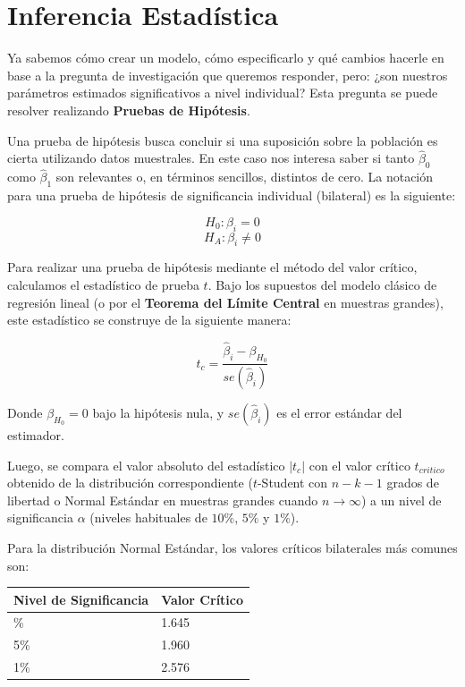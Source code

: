 \documentclass[
]{book}
\begin{document}
\section{Inferencia Estadística}\label{inferencia-estaduxedstica}

Ya sabemos cómo crear un modelo, cómo especificarlo y qué cambios hacerle en base a la pregunta de investigación que queremos responder, pero: ¿son nuestros parámetros estimados significativos a nivel individual? Esta pregunta se puede resolver realizando \textbf{Pruebas de Hipótesis}.

Una prueba de hipótesis busca concluir si una suposición sobre la población es cierta utilizando datos muestrales. En este caso nos interesa saber si tanto \(\hat{\beta}_0\) como \(\hat{\beta}_1\) son relevantes o, en términos sencillos, distintos de cero. La notación para una prueba de hipótesis de significancia individual (bilateral) es la siguiente:

\[H_0: \beta_i = 0\]
\[H_A: \beta_i \neq 0\]

Para realizar una prueba de hipótesis mediante el método del valor crítico, calculamos el estadístico de prueba \(t\). Bajo los supuestos del modelo clásico de regresión lineal (o por el \textbf{Teorema del Límite Central} en muestras grandes), este estadístico se construye de la siguiente manera:

\[t_c = \frac{\hat{\beta}_i - \beta_{H_0}}{se(\hat{\beta}_i)}\]

Donde \(\beta_{H_0} = 0\) bajo la hipótesis nula, y \(se(\hat{\beta}_i)\) es el error estándar del estimador.

Luego, se compara el valor absoluto del estadístico \(|t_c|\) con el valor crítico \(t_{critico}\) obtenido de la distribución correspondiente (\(t\)-Student con \(n-k-1\) grados de libertad o Normal Estándar en muestras grandes cuando \(n\rightarrow \infty\)) a un nivel de significancia \(\alpha\) (niveles habituales de \(10\%\), \(5\%\) y \(1\%\)).

Para la distribución Normal Estándar, los valores críticos bilaterales más comunes son:

\begin{longtable}[]{@{}ll@{}}
\toprule\noalign{}
Nivel de Significancia & Valor Crítico \\
\midrule\noalign{}
\endhead
\bottomrule\noalign{}
\endlastfoot
10\% & 1.645 \\
5\% & 1.960 \\
1\% & 2.576 \\
\end{longtable}
\end{document}
